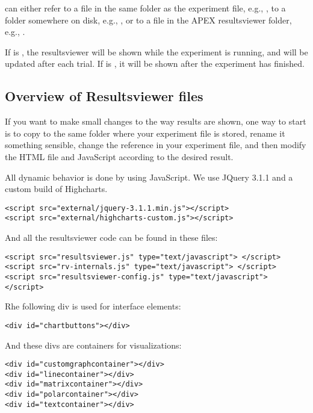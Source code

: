  can either refer to a file in the same folder as the experiment file, e.g., , to a folder somewhere on disk, e.g., , or to a file in the APEX resultsviewer folder, e.g., .

If  is , the resultsviewer will be shown while the experiment is running, and will be updated after each trial. If  is , it will be shown after the experiment has finished.

\subsection{Overview of Resultsviewer files}

If you want to make small changes to the way results are shown, one way to start is to copy  to the same folder where your experiment file is stored, rename it something sensible, change the reference in your experiment file, and then modify the HTML file and JavaScript according to the desired result.

All dynamic behavior is done by using JavaScript. We use JQuery 3.1.1 and a custom build of Highcharts.

\begin{lstlisting}
<script src="external/jquery-3.1.1.min.js"></script>
<script src="external/highcharts-custom.js"></script>
\end{lstlisting}

And all the resultsviewer code can be found in these files:

\begin{lstlisting}
<script src="resultsviewer.js" type="text/javascript"> </script>
<script src="rv-internals.js" type="text/javascript"> </script>
<script src="resultsviewer-config.js" type="text/javascript"> </script>
\end{lstlisting}

Rhe following div is used for interface elements:

\begin{lstlisting}
<div id="chartbuttons"></div>
\end{lstlisting}

And these divs are containers for visualizations:

\begin{lstlisting}
<div id="customgraphcontainer"></div>
<div id="linecontainer"></div>
<div id="matrixcontainer"></div>
<div id="polarcontainer"></div>
<div id="textcontainer"></div>
\end{lstlisting}


